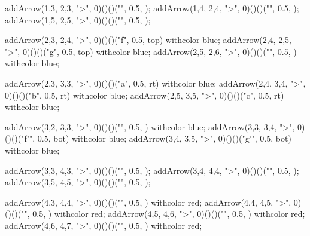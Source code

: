   addArrow(1,3, 2,3, ">", 0)()()("", 0.5, );
  addArrow(1,4, 2,4, ">", 0)()()("", 0.5, );
  addArrow(1,5, 2,5, ">", 0)()()("", 0.5, );
  
  addArrow(2,3, 2,4, ">", 0)()()("f", 0.5, top) withcolor blue;
  addArrow(2,4, 2,5, ">", 0)()()("g", 0.5, top) withcolor blue;
  addArrow(2,5, 2,6, ">", 0)()()("", 0.5, ) withcolor blue;

  addArrow(2,3, 3,3, ">", 0)()()("a", 0.5, rt) withcolor blue;
  addArrow(2,4, 3,4, ">", 0)()()("b", 0.5, rt) withcolor blue;
  addArrow(2,5, 3,5, ">", 0)()()("c", 0.5, rt) withcolor blue;

  addArrow(3,2, 3,3, ">", 0)()()("", 0.5, ) withcolor blue;
  addArrow(3,3, 3,4, ">", 0)()()("f'", 0.5, bot) withcolor blue;
  addArrow(3,4, 3,5, ">", 0)()()("g'", 0.5, bot) withcolor blue;

  addArrow(3,3, 4,3, ">", 0)()()("", 0.5, );
  addArrow(3,4, 4,4, ">", 0)()()("", 0.5, );
  addArrow(3,5, 4,5, ">", 0)()()("", 0.5, );
  
  addArrow(4,3, 4,4, ">", 0)()()("", 0.5, ) withcolor red;
  addArrow(4,4, 4,5, ">", 0)()()("", 0.5, ) withcolor red;
  addArrow(4,5, 4,6, ">", 0)()()("", 0.5, ) withcolor red;
  addArrow(4,6, 4,7, ">", 0)()()("", 0.5, ) withcolor red;

\stopMPcode\stopformula
\stopbuffer

\processTEXbuffer

\typebuffer


\stopchapter 